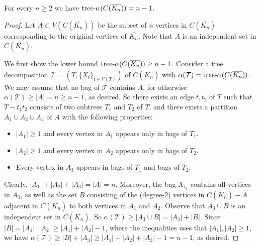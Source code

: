 \documentclass[a4paper, cleveref, autoref, thm-restate]{lipics-v2021}
\newcommand{\T}{\mathcal{T}}
\newcommand{\treea}{{\rm tree}\textnormal{-}\alpha}
\begin{document}
\begin{lemma}\label{lemma:subdivision-of-Kn-tree-alpha-lower-bound}
    For every $n \geq 2$ we have $\treea(C(\overline{K_n})) = n-1$. %
\end{lemma}
%
\begin{proof}
    Let $A \subset V(C(\overline{K_n}))$ be the subset of $n$ vertices in $C(\overline{K_n})$ corresponding to the original vertices of $\overline {K_n}$.
    Note that $A$ is an independent set in $C(\overline{K_n})$.
    
    We first show the lower bound $\treea(C(\overline{K_n})) \geq n-1$.
    Consider a tree decomposition $\T = (T,\{X_t\}_{t\in V(T)})$ of $C(\overline{K_n})$ with $\alpha(\T) = \treea(C(\overline{K_n}))$.
    We may assume that no bag of $\T$ contains $A$, for otherwise $\alpha(\T) \geq |A| = n \geq n-1$, as desired.
    So there exists an edge $t_1t_2$ of $T$ such that $T - t_1t_2$ consists of two subtrees $T_1$ and $T_2$ of $T$, and there exists a partition $A_1 \cup A_2 \cup A_3$ of $A$ with the following properties:
    \begin{itemize}
        \item $|A_1| \geq 1$ and every vertex in $A_1$ appears only in bags of $T_1$.
        \item $|A_2| \geq 1$ and every vertex in $A_2$ appears only in bags of $T_2$.
        \item Every vertex in $A_3$ appears in bags of $T_1$ and bags of $T_2$.
    \end{itemize}
    Clearly, $|A_1|+|A_2|+|A_3| = |A| = n$.
    Moreover, the bag $X_{t_1}$ contains all vertices in $A_3$, as well as the set $B$ consisting of the (degree-$2$) vertices in $C(\overline{K_n})-A$ adjacent in $C(\overline{K_n})$ to both vertices in $A_1$ and $A_2$.
    Observe that $A_3 \cup B$ is an independent set in $C(\overline{K_n})$.
    So $\alpha(\T) \geq |A_3 \cup B| = |A_3| + |B|$.
    Since $|B| = |A_1|\cdot |A_2| \geq |A_1|+|A_2|-1$, where the inequalities uses that $|A_1|,|A_2| \geq 1$, we have $\alpha(\T) \geq |B| + |A_3| \geq |A_1|+|A_2|+|A_3|-1 = n-1$, as desired.

    \medskip


\end{proof}
\end{document}
